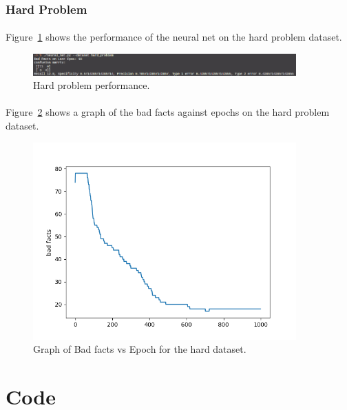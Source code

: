 \documentclass[11pt, a4paper]{article}
\begin{document}
            \subsubsection{Hard Problem}
            \paragraph{}Figure~\ref{fig:hard_problem_perf} shows the performance of the neural net on the hard problem dataset.
            \begin{figure}[H]
                \centering
                \includegraphics[width=0.9\textwidth, keepaspectratio]{hard_problem_stats.png}
                \caption{Hard problem performance.}
                \label{fig:hard_problem_perf}
            \end{figure}
            \paragraph{}Figure~\ref{fig:hard_problem_bad_epoch} shows  a graph of the bad facts against epochs on the hard problem dataset.
            \begin{figure}[H]
                \centering
                \includegraphics[width=0.9\textwidth, keepaspectratio]{hard_problem.png}
                \caption{Graph of Bad facts vs Epoch for the hard dataset.}
                \label{fig:hard_problem_bad_epoch}
            \end{figure}
    \section{Code}
\end{document}
